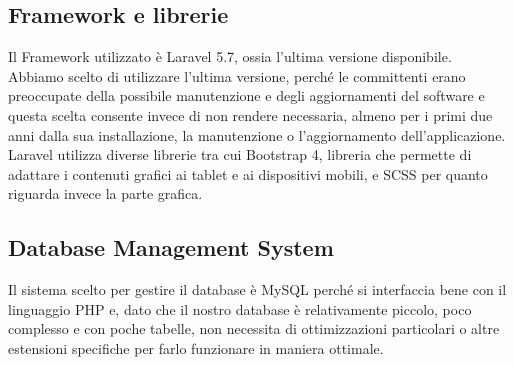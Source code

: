 \documentclass[twoside]{supsistudent}
\begin{document}
\subsection{Framework e librerie}
Il Framework utilizzato è Laravel 5.7, ossia l’ultima versione disponibile. Abbiamo scelto di utilizzare l’ultima versione, perché le committenti erano preoccupate della possibile manutenzione e degli aggiornamenti del software e questa scelta consente invece di non rendere necessaria, almeno per i primi due anni dalla sua installazione, la manutenzione o l’aggiornamento dell’applicazione.\\
Laravel utilizza diverse librerie tra cui Bootstrap 4, libreria che permette di adattare i contenuti grafici ai tablet e ai dispositivi mobili, e SCSS per quanto riguarda invece la parte grafica.

\subsection{Database Management System}
Il sistema scelto per gestire il database è MySQL perché si interfaccia bene con il linguaggio PHP e, dato che il nostro database è relativamente piccolo, poco complesso e con poche tabelle, non necessita di ottimizzazioni particolari o altre estensioni specifiche per farlo funzionare in maniera ottimale.
\end{document}
